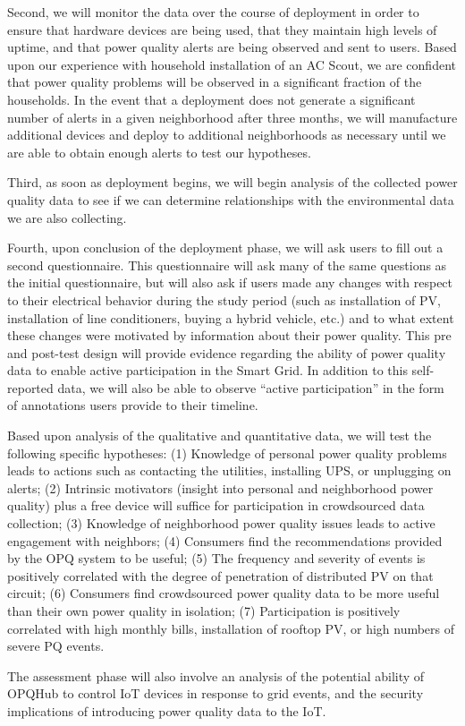 Second, we will monitor the data over the course of deployment in order to ensure that hardware devices are being used, that they maintain high levels of uptime, and that power quality alerts are being observed and sent to users.  Based upon our experience with household installation of an AC Scout, we are confident that power quality problems will be observed in a significant fraction of the households.  In the event that a deployment does not generate a significant number of alerts in a given neighborhood after three months, we will manufacture additional devices and deploy to additional neighborhoods as necessary until we are able to obtain enough alerts to test our hypotheses.

Third, as soon as deployment begins, we will begin analysis of the collected power quality data to see if we can determine relationships with the environmental data we are also collecting. 

Fourth, upon conclusion of the deployment phase, we will ask users to fill out a second questionnaire.  This questionnaire will ask many of the same questions as the initial questionnaire, but will also ask if users made any changes with respect to their electrical behavior during the study period (such as installation of PV, installation of line conditioners, buying a hybrid vehicle, etc.) and to what extent these changes were motivated by information about their power quality.  This pre and post-test design will provide evidence regarding the ability of power quality data to enable active participation in the Smart Grid.  In addition to this self-reported data, we will also be able to observe ``active participation'' in the form of annotations users provide to their timeline.

Based upon analysis of the qualitative and quantitative data, we will test the following specific hypotheses: (1) Knowledge of personal power quality problems leads to actions such as contacting the utilities, installing UPS, or unplugging on alerts; (2) Intrinsic motivators (insight into personal and neighborhood power quality) plus a free device will suffice for participation in crowdsourced data collection; (3) Knowledge of neighborhood power quality issues leads to active engagement with neighbors; (4) Consumers find the recommendations provided by the OPQ system to be useful; (5) The frequency and severity of events is positively correlated with the degree of penetration of distributed PV on that circuit; (6) Consumers find crowdsourced power quality data to be more useful than their own power quality in isolation; (7) Participation is positively correlated with high monthly bills, installation of rooftop PV, or high numbers of severe PQ events.

The assessment phase will also involve an analysis of the potential ability of OPQHub to control IoT devices in response to grid events, and the security implications of introducing power quality data to the IoT.
















